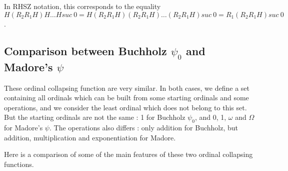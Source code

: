 \documentclass[10pt]{article}
\begin{document}
In RHSZ notation, this corresponds to the equality \( H (R_2 R_1 H) H \ldots H suc\ 0 = H (R_2 R_1 H) (R_2 R_1 H) \ldots (R_2 R_1 H) suc\ 0 = R_1 (R_2 R_1 H) suc\ 0 \).

\subsection{Comparison between Buchholz \( \psi_0 \) and Madore's \( \psi \)}

These ordinal collapsing function are very similar. In both cases, we define a set containing all ordinals which can be built from some starting ordinals and some operations, and we consider the least ordinal which does not belong to this set. But the starting ordinals are not the same : 1 for Buchholz \( \psi_0 \), and 0, 1, \( \omega \) and \( \Omega \) for Madore's \( \psi \). The operations also differs : only addition for Buchholz, but addition, multiplication and exponentiation for Madore. 

\bigskip

Here is a comparison of some of the main features of these two ordinal collapsing functions.

\bigskip
\end{document}
